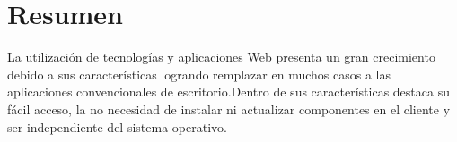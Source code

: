 \documentclass[oneside,a4paper,11pt]{book}
\begin{document}

\clearpage
\thispagestyle{empty}

\vspace{5cm}



\chapter*{Resumen}
\pagestyle{plain}
La utilización de tecnologías y aplicaciones Web presenta un gran crecimiento debido a sus características logrando remplazar en muchos casos a las aplicaciones convencionales de escritorio.Dentro de sus características destaca su fácil acceso, la no necesidad de instalar ni actualizar componentes en el cliente y ser independiente del sistema operativo.
\end{document}
